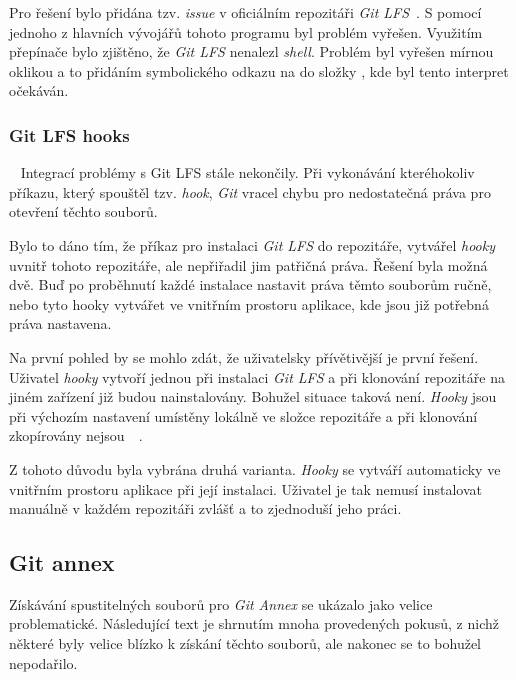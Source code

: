     Pro řešení bylo přidána tzv. \emph{issue} v oficiálním repozitáři \emph{Git LFS}~. S pomocí jednoho z hlavních vývojářů tohoto programu byl problém vyřešen. Využitím přepínače  bylo zjištěno, že \emph{Git LFS} nenalezl \emph{shell}. Problém byl vyřešen mírnou oklikou a to přidáním symbolického odkazu na  do složky , kde byl tento interpret očekáván.

    \subsubsection{Git LFS hooks}~\label{subsub:problemy_git_hooks}
    Integrací problémy s Git LFS stále nekončily. Při vykonávání kteréhokoliv příkazu, který spouštěl tzv. \emph{hook}, \emph{Git} vracel chybu pro nedostatečná práva pro otevření těchto souborů.
    
    Bylo to dáno tím, že příkaz pro instalaci \emph{Git LFS} do repozitáře, vytvářel \emph{hooky} uvnitř tohoto repozitáře, ale nepřiřadil jim patřičná práva. Řešení byla možná dvě. Buď po proběhnutí každé instalace nastavit práva těmto souborům ručně, nebo tyto hooky vytvářet ve vnitřním prostoru aplikace, kde jsou již potřebná práva nastavena.
    
    Na první pohled by se mohlo zdát, že uživatelsky přívětivější je první řešení. Uživatel \emph{hooky} vytvoří jednou při instalaci \emph{Git LFS} a při klonování repozitáře na jiném zařízení již budou nainstalovány. Bohužel situace taková není. \emph{Hooky} jsou při výchozím nastavení umístěny lokálně ve složce  repozitáře a při klonování zkopírovány nejsou~~.

    Z tohoto důvodu byla vybrána druhá varianta. \emph{Hooky} se vytváří automaticky ve vnitřním prostoru aplikace při její instalaci. Uživatel je tak nemusí instalovat manuálně v každém repozitáři zvlášť a to zjednoduší jeho práci.

    \subsection{Git annex}\label{sec:problemy_annex}
    Získávání spustitelných souborů pro \emph{Git Annex} se ukázalo jako velice problematické. Následující text je shrnutím mnoha provedených pokusů, z nichž některé byly velice blízko k získání těchto souborů, ale nakonec se to bohužel nepodařilo.


